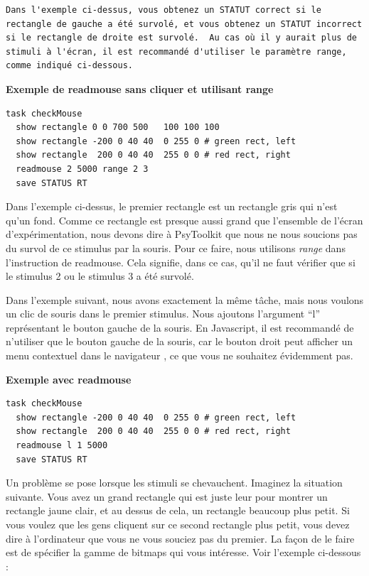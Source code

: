 \documentclass[
]{book}
\begin{document}
\begin{verbatim}
Dans l'exemple ci-dessus, vous obtenez un STATUT correct si le rectangle de gauche a été survolé, et vous obtenez un STATUT incorrect si le rectangle de droite est survolé.  Au cas où il y aurait plus de stimuli à l'écran, il est recommandé d'utiliser le paramètre range, comme indiqué ci-dessous.
\end{verbatim}

\textbf{Exemple de readmouse sans cliquer et utilisant range}

\begin{verbatim}
task checkMouse
  show rectangle 0 0 700 500   100 100 100
  show rectangle -200 0 40 40  0 255 0 # green rect, left
  show rectangle  200 0 40 40  255 0 0 # red rect, right
  readmouse 2 5000 range 2 3
  save STATUS RT
\end{verbatim}

Dans l'exemple ci-dessus, le premier rectangle est un rectangle gris qui n'est qu'un fond. Comme ce rectangle est presque aussi grand que l'ensemble de l'écran d'expérimentation, nous devons dire à PsyToolkit que nous ne nous soucions pas du survol de ce stimulus par la souris. Pour ce faire, nous utilisons \emph{range} dans l'instruction de readmouse. Cela signifie, dans ce cas, qu'il ne faut vérifier que si le stimulus 2 ou le stimulus 3 a été survolé.

Dans l'exemple suivant, nous avons exactement la même tâche, mais nous voulons un clic de souris dans le premier stimulus. Nous ajoutons l'argument ``l'' représentant le bouton gauche de la souris. En Javascript, il est recommandé de n'utiliser que le bouton gauche de la souris, car le bouton droit peut afficher un menu contextuel dans le navigateur , ce que vous ne souhaitez évidemment pas.

\textbf{Exemple avec readmouse}

\begin{verbatim}
task checkMouse
  show rectangle -200 0 40 40  0 255 0 # green rect, left
  show rectangle  200 0 40 40  255 0 0 # red rect, right
  readmouse l 1 5000
  save STATUS RT
\end{verbatim}

Un problème se pose lorsque les stimuli se chevauchent. Imaginez la situation suivante. Vous avez un grand rectangle qui est juste leur pour montrer un rectangle jaune clair, et au dessus de cela, un rectangle beaucoup plus petit. Si vous voulez que les gens cliquent sur ce second rectangle plus petit, vous devez dire à l'ordinateur que vous ne vous souciez pas du premier. La façon de le faire est de spécifier la gamme de bitmaps qui vous intéresse. Voir l'exemple ci-dessous :
\end{document}
